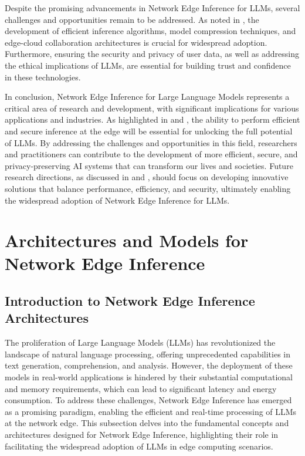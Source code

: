 \documentclass[11pt,a4paper]{article}
\begin{document}
Despite the promising advancements in Network Edge Inference for LLMs, several challenges and opportunities remain to be addressed. As noted in \cite{doi:10.3390/app14052074}, the development of efficient inference algorithms, model compression techniques, and edge-cloud collaboration architectures is crucial for widespread adoption. Furthermore, ensuring the security and privacy of user data, as well as addressing the ethical implications of LLMs, are essential for building trust and confidence in these technologies.

In conclusion, Network Edge Inference for Large Language Models represents a critical area of research and development, with significant implications for various applications and industries. As highlighted in \cite{doi:10.1007/s42452-025-07668-w} and \cite{doi:10.1109/mc.2024.3399384}, the ability to perform efficient and secure inference at the edge will be essential for unlocking the full potential of LLMs. By addressing the challenges and opportunities in this field, researchers and practitioners can contribute to the development of more efficient, secure, and privacy-preserving AI systems that can transform our lives and societies. Future research directions, as discussed in \cite{doi:10.1109/access.2024.3424945} and \cite{doi:10.1109/ojcs.2025.3580498}, should focus on developing innovative solutions that balance performance, efficiency, and security, ultimately enabling the widespread adoption of Network Edge Inference for LLMs.


\section{Architectures and Models for Network Edge Inference}



\subsection{Introduction to Network Edge Inference Architectures}


The proliferation of Large Language Models (LLMs) has revolutionized the landscape of natural language processing, offering unprecedented capabilities in text generation, comprehension, and analysis. However, the deployment of these models in real-world applications is hindered by their substantial computational and memory requirements, which can lead to significant latency and energy consumption. To address these challenges, Network Edge Inference has emerged as a promising paradigm, enabling the efficient and real-time processing of LLMs at the network edge. This subsection delves into the fundamental concepts and architectures designed for Network Edge Inference, highlighting their role in facilitating the widespread adoption of LLMs in edge computing scenarios.
\end{document}
